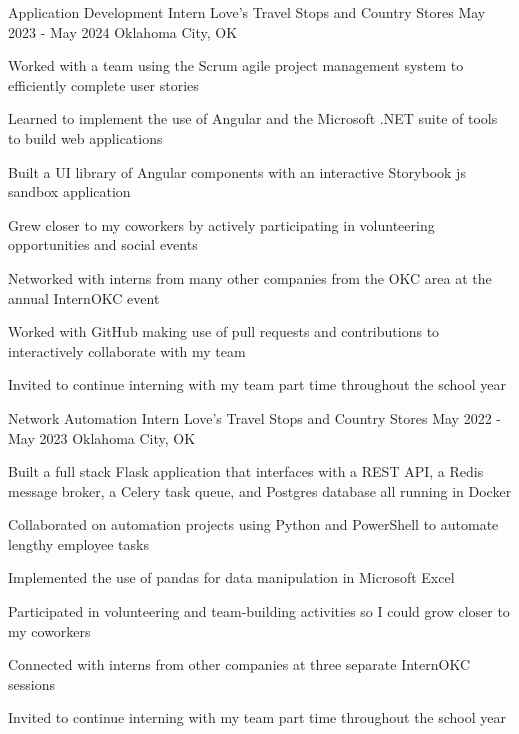\documentclass[letterpaper]{resumeconfig}
\begin{document}
\WorkExperience
    {Application Development Intern} %
    {Love's Travel Stops and Country Stores} %
    {May 2023 - May 2024} %
    {Oklahoma City, OK} %
    {
        \item Worked with a team using the Scrum agile project management system to efficiently complete user stories
        \item Learned to implement the use of Angular and the Microsoft .NET suite of tools to build web applications
        \item Built a UI library of Angular components with an interactive Storybook js sandbox application
        \item Grew closer to my coworkers by actively participating in volunteering opportunities and social events
        \item Networked with interns from many other companies from the OKC area at the annual InternOKC event
        \item Worked with GitHub making use of pull requests and contributions to interactively collaborate with my team
        \item Invited to continue interning with my team part time throughout the school year
    }
    \vspace{1em}

\WorkExperience
    {Network Automation Intern} %
    {Love's Travel Stops and Country Stores} %
    {May 2022 - May 2023} %
    {Oklahoma City, OK} %
    {
    	\item Built a full stack Flask application that interfaces with a REST API, a Redis message broker, a Celery task queue, and Postgres database all running in Docker
        \item Collaborated on automation projects using Python and PowerShell to automate lengthy employee tasks
        \item Implemented the use of pandas for data manipulation in Microsoft Excel
        \item Participated in volunteering and team-building activities so I could grow closer to my coworkers
        \item Connected with interns from other companies at three separate InternOKC sessions
        \item Invited to continue interning with my team part time throughout the school year
    }
    
\end{document}
